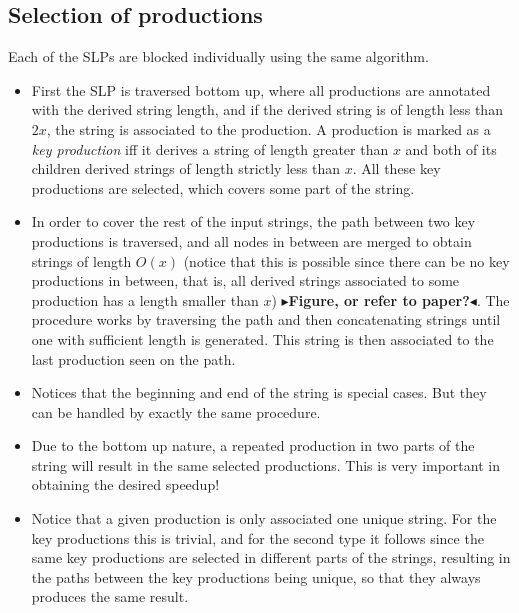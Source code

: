 \documentclass[twoside,11pt,openright]{report}
\newcommand{\todo}[1]{{\color[rgb]{.5,0,0}\textbf{$\blacktriangleright$#1$\blacktriangleleft$}}}
\begin{document}
\subsection{Selection of productions}
\label{sec:algorithm:select-productions}
Each of the SLPs are blocked individually using the same algorithm.
\begin{itemize}
  \item First the SLP is traversed bottom up, where all productions are annotated with the derived string length, and if the derived string is of length less than $2x$, the string is associated to the production. A production is marked as a \textit{key production} iff it derives a string of length greater than $x$ and both of its children derived strings of length strictly less than $x$. All these key productions are selected, which covers some part of the string.
  \item In order to cover the rest of the input strings, the path between two key productions is traversed, and all nodes in between are merged to obtain strings of length $O(x)$ (notice that this is possible since there can be no key productions in between, that is, all derived strings associated to some production has a length smaller than $x$) \todo{Figure, or refer to paper?}. The procedure works by traversing the path and then concatenating strings until one with sufficient length is generated. This string is then associated to the last production seen on the path.
  \item Notices that the beginning and end of the string is special cases. But they can be handled by exactly the same procedure.
  \item Due to the bottom up nature, a repeated production in two parts of the string will result in the same selected productions. This is very important in obtaining the desired speedup!
  \item Notice that a given production is only associated one unique string. For the key productions this is trivial, and for the second type it follows since the same key productions are selected in different parts of the strings, resulting in the paths between the key productions being unique, so that they always produces the same result.
\end{itemize}
\end{document}
